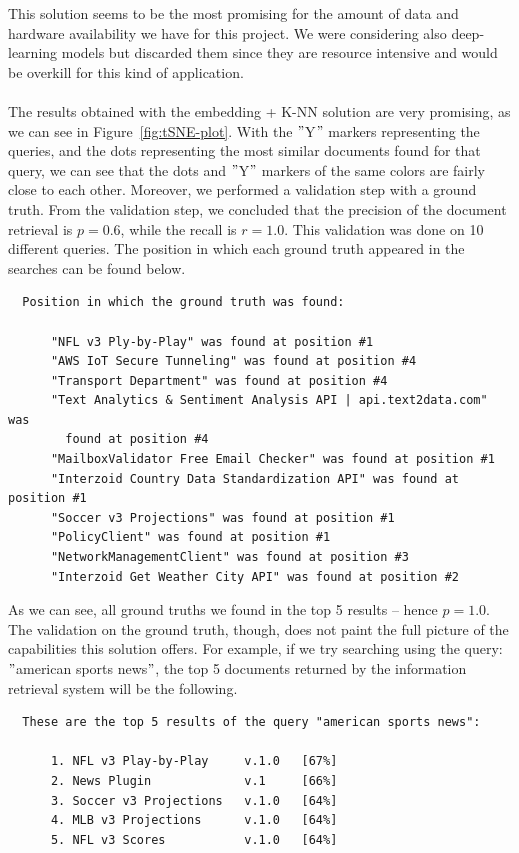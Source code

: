 This solution seems to be the most promising for the amount of data and hardware availability we have for this project.
We were considering also deep-learning models but discarded them since they are resource intensive and would be overkill for this kind of application. \\ \\
The results obtained with the embedding + K-NN solution are very promising, as we can see in Figure~\ref{fig:tSNE-plot}.
With the \("\)Y\("\) markers representing the queries, and the dots representing the most similar documents found for that query, we can see that the dots and \("\)Y\("\) markers of the same colors are fairly close to each other.
Moreover, we performed a validation step with a ground truth.
From the validation step, we concluded that the precision of the document retrieval is $p = 0.6$, while the recall is $r = 1.0$.
This validation was done on 10 different queries.
The position in which each ground truth appeared in the searches can be found below.
\begin{verbatim}
  Position in which the ground truth was found:

      "NFL v3 Ply-by-Play" was found at position #1
      "AWS IoT Secure Tunneling" was found at position #4
      "Transport Department" was found at position #4
      "Text Analytics & Sentiment Analysis API | api.text2data.com" was
        found at position #4
      "MailboxValidator Free Email Checker" was found at position #1
      "Interzoid Country Data Standardization API" was found at position #1
      "Soccer v3 Projections" was found at position #1
      "PolicyClient" was found at position #1
      "NetworkManagementClient" was found at position #3
      "Interzoid Get Weather City API" was found at position #2
\end{verbatim}
As we can see, all ground truths we found in the top 5 results -- hence $p = 1.0$.
The validation on the ground truth, though, does not paint the full picture of the capabilities this solution offers.
For example, if we try searching using the query: \("\)american sports news\("\), the top 5 documents returned by the information retrieval system will be the following.
\begin{verbatim}
  These are the top 5 results of the query "american sports news":

      1. NFL v3 Play-by-Play     v.1.0   [67%]
      2. News Plugin             v.1     [66%]
      3. Soccer v3 Projections   v.1.0   [64%]
      4. MLB v3 Projections      v.1.0   [64%]
      5. NFL v3 Scores           v.1.0   [64%]
\end{verbatim}
